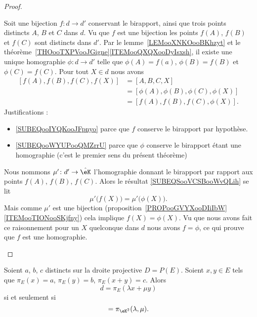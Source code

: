\begin{proof}
\begin{subproof}
            Soit une bijection \( f\colon d\to d'\) conservant le birapport, ainsi que trois points distincts \( A\), \( B\) et \( C\) dans \( d\). Vu que \( f\) est une bijection les points \( f(A)\), \( f(B)\) et \( f(C)\) sont distincts dans \( d'\). Par le lemme~\ref{LEMooXNKOooBKhzyt} et le théorème~\ref{THOooTXPVooJGigne}\ref{ITEMooQXQXooDyIsxsh}, il existe une unique homographie \( \phi\colon d\to d'\) telle que \( \phi(A)=f(a)\), \( \phi(B)=f(B)\) et \( \phi(C)=f(C)\). Pour tout \( X\in d\) nous avons
            \begin{subequations}        \label{SUBEQSooVCSBooWvQLih}
                \begin{align}
                    [f(A),f(B),f(C),f(X)]&=[A,B,C,X]   \label{SUBEQooIYQKooJFpnyo}\\
                    &=[\phi(A),\phi(B),\phi(C),\phi(X)]     \label{SUBEQooWYUPooQMZrrU}\\
                    &=[f(A),f(B),f(C),\phi(X)].
                \end{align}
            \end{subequations}
            Justifications :
            \begin{itemize}
                \item \eqref{SUBEQooIYQKooJFpnyo} parce que \( f\) conserve le birapport par hypothèse.
                \item \eqref{SUBEQooWYUPooQMZrrU} parce que \( \phi\) conserve le birapport étant une homographie (c'est le premier sens du présent théorème)
            \end{itemize}
            Nous nommons \( \mu'\colon d'\to \hat\eK\) l'homographie donnant le birapport par rapport aux points \( f(A)\), \( f(B)\), \( f(C)\). Alors le résultat \eqref{SUBEQSooVCSBooWvQLih} se lit
            \begin{equation}
                \mu'\big( f(X) \big)=\mu'\big( \phi(X) \big).
            \end{equation}
            Mais comme \( \mu'\) est une bijection (proposition~\ref{PROPooGVYXooDIiIbW}\ref{ITEMooTIONooSKjfny}) cela implique \( f(X)=\phi(X)\). Vu que nous avons fait ce raisonnement pour un \( X\) quelconque dans \( d\) nous avons \( f=\phi\), ce qui prouve que \( f\) est une homographie.
    \end{subproof}
\end{proof}

\begin{lemma}
    Soient \( a\), \( b\), \( c\) distincts sur la droite projective \( D=P(E)\). Soient \( x,y\in E\) tels que \( \pi_E(x)=a\), \( \pi_E(y)=b\), \( \pi_E(x+y)=c\). Alors
    \begin{equation}
        d=\pi_E(\lambda x+\mu y)
    \end{equation}
    si et seulement si
    \begin{equation}
        [a,b,c,d]=\pi_{\eK^2}(\lambda,\mu).
    \end{equation}
\end{lemma}


